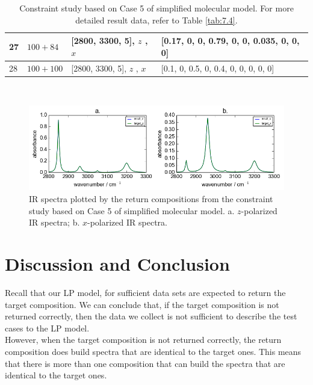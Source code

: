 \begin{table}[ht!]
\begin{center}
{\begin{tabular}{| p{1cm} | p{2cm} | p{4cm}  | l |}
27 & $100 + 84$ & [2800, 3300, 5], $z$ \newline [2800, 3300, 6], $x$  & [0.17, 0, 0, 0.79, 0, 0, 0.035, 0, 0, 0] \\ \hline
28 & $100 + 100$ & [2800, 3300, 5], $z$ \newline [2800, 3300, 5], $x$  & [0.1, 0, 0.5, 0, 0.4, 0, 0, 0, 0, 0] \\ 
\hline
\end{tabular} \\
}
\caption{Constraint study based on Case 5 of simplified molecular model. For more detailed result data, refer to Table \ref{tab:7.4}.}\label{tab:3.5}
\end{center}
\end{table}

\begin{figure}[!ht] 
\centering
\includegraphics[scale=0.7]{Figures/toy_model_result_plotting_ir_sin_10candi_constraint_study_experiment5.png} 
\caption{IR spectra plotted by the return compositions from the constraint study based on Case 5 of simplified molecular model. a. $z$-polarized IR spectra; b. $x$-polarized IR spectra.}\label{fig:3.6}
\end{figure}

\section{Discussion and Conclusion}

Recall that our LP model, for sufficient data sets are expected to return the target composition. We can conclude that, if the target composition is not returned correctly, then the data we collect is not sufficient to describe the test cases to the LP model. \\

However, when the target composition is not returned correctly, the return composition does build spectra that are identical to the target ones. This means that there is more than one composition that can build the spectra that are identical to the target ones. \\

